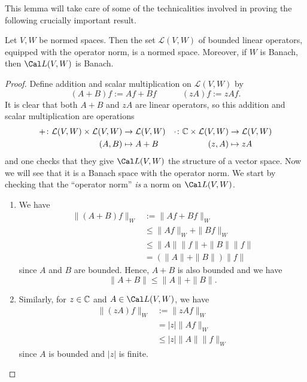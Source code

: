 This lemma will take care of some of the technicalities involved in proving the following crucially important result.

\begin{theorem}
Let \(V,W\) be normed spaces. Then the set $\mathcal{L}(V,W)$ of
bounded linear operators, equipped with the operator norm, is a normed space.
Moreover, if \(W\) is Banach, then \(\Cal L(V,W)\) is Banach.
\end{theorem}

\begin{proof}
Define addition and scalar multiplication on $\mathcal{L}(V,W)$ by
\begin{equation*}
(A+B)f := Af+Bf \quad \qquad (zA)f := zAf.
\end{equation*}
It is clear that both $A+B$ and $zA$ are linear operators, so this
addition and scalar multiplication are operations
\begin{align*}
  +\colon \mathcal{L}(V,W)\times \mathcal{L}(V,W) & \to\mathcal{L}(V,W)
  &
  \cdot \colon \mathbb{C} \times \mathcal{L}(V,W) & \to \mathcal{L}(V,W)\\
  (A,B) & \mapsto A+B 
        &
  (z,A) & \mapsto zA
\end{align*}
and one checks that they give \(\Cal L(V,W)\) the structure
of a vector space.
Now we will see that it is a Banach space with the operator norm.
We start by checking that the ``operator norm'' \emph{is} a norm on \(\Cal
L(V,W)\).
\begin{enumerate}[label=(\alph*)]
\item
  We have
  \begin{align*}
    \|(A+B)f\|_W
    &:= \|Af+Bf\|_W \\
    &\leq \|Af\|_W+\|Bf\|_W \\
    &\leq \|A\|\|f\| + \|B\|\|f\| \\
    &= (\|A\|+ \|B\|)\|f\|
  \end{align*}
  since $A$ and $B$ are bounded. Hence, $A+B$ is also bounded and we have
  \begin{equation*}
  \|A+B\|\leq \|A\|+\|B\|.
  \end{equation*}
  \item
  Similarly, for $z\in\mathbb{C}$ and \(A\in\Cal L(V,W)\), we have 
  \begin{align*}
    \|(zA)f\|_W
    &:= \|zAf\|_W \\
    &= |z|\|Af\|_W \\
    &\leq |z|\|A\|\|f\|_W
  \end{align*}
  since $A$ is bounded and $|z|$ is finite.

\end{enumerate}
\end{proof}
